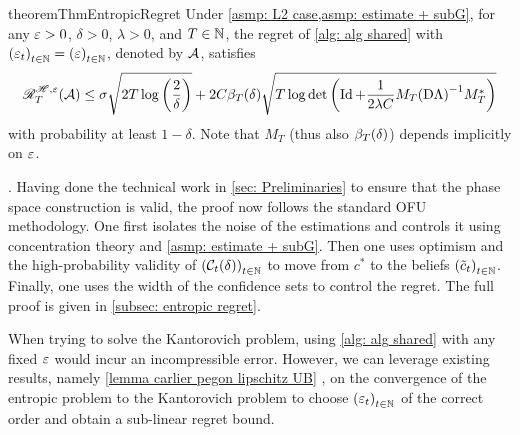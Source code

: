 \begin{restatable}{theorem}{ThmEntropicRegret}\label{thm: entropic regret}
    Under \cref{asmp: L2 case,asmp: estimate + subG}, for any $\varepsilon>0$, $\delta>0$, $\lambda>0$, and $T\in\mathbb{N}$, the regret of \cref{alg: alg shared} with ${(\varepsilon_t)}_{t\in\mathbb{N}}={(\varepsilon)}_{t\in\mathbb{N}}$, denoted by $\mathcal{A}$, satisfies
    \begin{align*}
        \mathscr{R}_T^{\mathscr{H},\varepsilon} (\mathcal{A})\le  \sigma\sqrt{2T\log\left(\frac2\delta\right)}+ 2C\beta_T(\delta)\sqrt{T\log\det\left(\operatorname{Id} + \frac{1}{2\lambda C}M_T{(\mathrm{D}\Lambda)}^{-1}M_T^*\right)}
    \end{align*}
    with probability at least $1-\delta$. Note that $M_T$ (thus also $\beta_T(\delta)$) depends implicitly on $\varepsilon$.
\end{restatable}

{
    \flushleft{}. Having done the technical work in \cref{sec: Preliminaries} to ensure that the phase space construction is valid, the proof now follows the standard OFU methodology. One first isolates the noise of the estimations and controls it using concentration theory and \cref{asmp: estimate + subG}. Then one uses optimism and the high-probability validity  of ${(\mathcal{C}_t(\delta))}_{t\in\mathbb{N}}$ to move from $c^*$ to the beliefs ${(\tilde c_t)}_{t\in\mathbb{N}}$. Finally, one uses the width of the confidence sets to control the regret. The full proof is given in \cref{subsec: entropic regret}.
}

When trying to solve the Kantorovich problem, using \cref{alg: alg shared} with any fixed $\varepsilon$ would incur an incompressible error. However, we can leverage existing results, namely \cref{lemma carlier pegon lipschitz UB} \citep{carlier_convergence_2023}, on the convergence of the entropic problem to the Kantorovich problem to choose ${(\varepsilon_t)}_{t\in\mathbb{N}}$ of the correct order and obtain a sub-linear regret bound.

